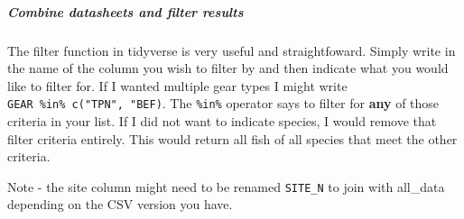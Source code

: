 \documentclass[
]{article}
\newenvironment{Shaded}{\begin{snugshade}}{\end{snugshade}}
\newcommand{\CommentTok}[1]{\textcolor[rgb]{0.56,0.35,0.01}{\textit{#1}}}
\newcommand{\DataTypeTok}[1]{\textcolor[rgb]{0.13,0.29,0.53}{#1}}
\newcommand{\DecValTok}[1]{\textcolor[rgb]{0.00,0.00,0.81}{#1}}
\newcommand{\KeywordTok}[1]{\textcolor[rgb]{0.13,0.29,0.53}{\textbf{#1}}}
\newcommand{\NormalTok}[1]{#1}
\newcommand{\OperatorTok}[1]{\textcolor[rgb]{0.81,0.36,0.00}{\textbf{#1}}}
\newcommand{\StringTok}[1]{\textcolor[rgb]{0.31,0.60,0.02}{#1}}
\begin{document}
\hypertarget{combine-datasheets-and-filter-results}{%
\subparagraph{Combine datasheets and filter
results}\label{combine-datasheets-and-filter-results}}

The filter function in tidyverse is very useful and straightfoward.
Simply write in the name of the column you wish to filter by and then
indicate what you would like to filter for. If I wanted multiple gear
types I might write \texttt{GEAR\ \%in\%\ c("TPN",\ "BEF)}. The
\texttt{\%in\%} operator says to filter for \textbf{any} of those
criteria in your list. If I did not want to indicate species, I would
remove that filter criteria entirely. This would return all fish of all
species that meet the other criteria.

Note - the site column might need to be renamed \texttt{SITE\_N} to join
with all\_data depending on the CSV version you have.

\begin{Shaded}
\end{Shaded}
\end{document}
